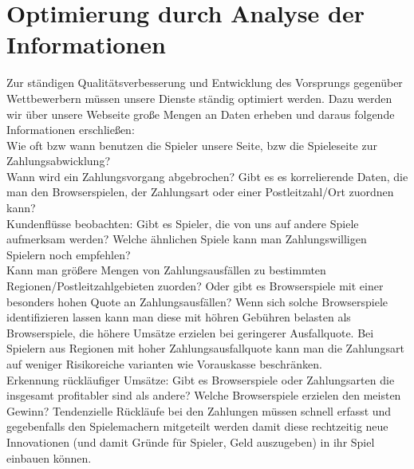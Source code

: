 \documentclass[a4paper,10pt]{article}
\begin{document}
\section{Optimierung durch Analyse der Informationen}\label{labelRelDaten}


Zur ständigen Qualitätsverbesserung und Entwicklung des Vorsprungs gegenüber Wettbewerbern müssen unsere Dienste ständig optimiert werden.
Dazu werden wir über unsere Webseite große Mengen an Daten erheben und daraus folgende Informationen erschließen:\\
Wie oft bzw wann benutzen die Spieler unsere Seite, bzw die Spieleseite zur Zahlungsabwicklung?\\
Wann wird ein Zahlungsvorgang abgebrochen? Gibt es es korrelierende Daten, die man den Browserspielen, der Zahlungsart oder einer Postleitzahl/Ort zuordnen kann?\\
Kundenflüsse beobachten: Gibt es Spieler, die von uns auf andere Spiele aufmerksam werden? Welche ähnlichen Spiele kann man Zahlungswilligen Spielern noch empfehlen?\\
Kann man größere Mengen von Zahlungsausfällen zu bestimmten Regionen/Postleitzahlgebieten zuorden? Oder gibt es Browserspiele mit einer besonders hohen Quote an Zahlungsausfällen?
Wenn sich solche Browserspiele identifizieren lassen kann man diese mit höhren Gebühren belasten als Browserspiele, die höhere Umsätze erzielen bei geringerer Ausfallquote.
Bei Spielern aus Regionen mit hoher Zahlungsausfallquote kann man die Zahlungsart auf weniger Risikoreiche varianten wie Vorauskasse beschränken.\\
Erkennung rückläufiger Umsätze: Gibt es Browserspiele oder Zahlungsarten die insgesamt profitabler sind als andere? Welche Browserspiele erzielen den meisten Gewinn?
Tendenzielle Rückläufe bei den Zahlungen müssen schnell erfasst und gegebenfalls den Spielemachern mitgeteilt werden damit diese rechtzeitig neue Innovationen (und damit Gründe für Spieler,
Geld auszugeben) in ihr Spiel einbauen können.
\end{document}
